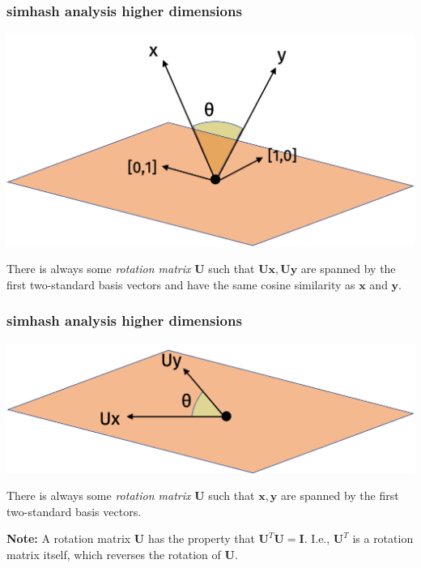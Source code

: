 \documentclass[compress]{beamer}
\newcommand{\bv}[1]{\mathbf{#1}}
\begin{document}
\begin{frame}
	\frametitle{simhash analysis higher dimensions}
	\begin{center}
		\includegraphics[width=.7\textwidth]{high_dim1.png}
	\end{center}
There is always some \emph{rotation matrix} $\bv{U}$ such that $\bv{U}\bv{x},\bv{U}\bv{y}$ are spanned by the first two-standard basis vectors and have the same cosine similarity as $\bv{x}$ and $\bv{y}$.
\end{frame}

\begin{frame}
	\frametitle{simhash analysis higher dimensions}
	\begin{center}
		\includegraphics[width=.7\textwidth]{high_dim2.png}
	\end{center}
	There is always some \emph{rotation matrix} $\bv{U}$ such that $\bv{x},\bv{y}$ are spanned by the first two-standard basis vectors. 
	
	
	\textbf{Note:} A rotation matrix $\bv{U}$ has the property that $\bv{U}^T\bv{U} = \bv{I}$. I.e., $\bv{U}^T$ is a rotation matrix itself, which reverses the rotation of $\bv{U}$.
\end{frame}
\end{document}
